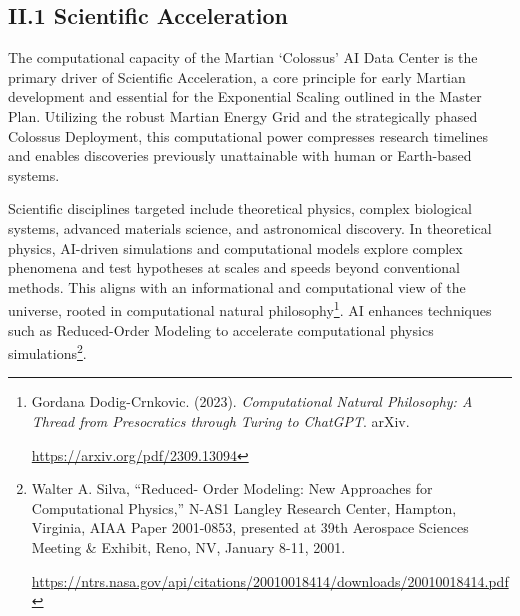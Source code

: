 \documentclass[fontsize=10pt, oneside, DIV=calc]{scrartcl}
\begin{document}
\subsection*{II.1 Scientific Acceleration}



\medskip

\noindent
The computational capacity of the Martian `Colossus' AI Data Center is the primary driver of Scientific Acceleration, a core principle for early Martian development and essential for the Exponential Scaling outlined in the Master Plan. Utilizing the robust Martian Energy Grid and the strategically phased Colossus Deployment, this computational power compresses research timelines and enables discoveries previously unattainable with human or Earth-based systems.

\medskip

\noindent
Scientific disciplines targeted include theoretical physics, complex biological systems, advanced materials science, and astronomical discovery. In theoretical physics, AI-driven simulations and computational models explore complex phenomena and test hypotheses at scales and speeds beyond conventional methods. This aligns with an informational and computational view of the universe, rooted in computational natural philosophy\footnote{Gordana Dodig-Crnkovic. (2023). \textit{Computational Natural Philosophy: A Thread from Presocratics through Turing to ChatGPT}. arXiv. 







\href{https://arxiv.org/pdf/2309.13094}\url{https://arxiv.org/pdf/2309.13094}}. AI enhances techniques such as Reduced-Order Modeling to accelerate computational physics simulations\footnote{Walter A. Silva, ``Reduced- Order Modeling: New Approaches for Computational Physics,'' N-AS1 Langley Research Center, Hampton, Virginia, AIAA Paper 2001-0853, presented at 39th Aerospace Sciences Meeting \& Exhibit, Reno, NV, January 8-11, 2001. 







\href{https://ntrs.nasa.gov/api/citations/20010018414/downloads/20010018414.pdf}\url{https://ntrs.nasa.gov/api/citations/20010018414/downloads/20010018414.pdf}}.

\medskip
\end{document}

